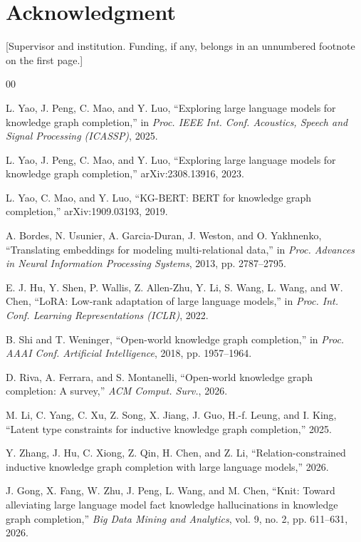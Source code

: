\documentclass[conference]{IEEEtran}
\begin{document}
\section*{Acknowledgment}

[Supervisor and institution. Funding, if any, belongs in an unnumbered footnote
on the first page.]

\begin{thebibliography}{00}

 L. Yao, J. Peng, C. Mao, and Y. Luo, ``Exploring large language
models for knowledge graph completion,'' in \emph{Proc. IEEE Int. Conf.
Acoustics, Speech and Signal Processing (ICASSP)}, 2025.

 L. Yao, J. Peng, C. Mao, and Y. Luo, ``Exploring large
language models for knowledge graph completion,'' arXiv:2308.13916, 2023.

 L. Yao, C. Mao, and Y. Luo, ``KG-BERT: BERT for knowledge graph
completion,'' arXiv:1909.03193, 2019.

 A. Bordes, N. Usunier, A. Garcia-Duran, J. Weston, and
O. Yakhnenko, ``Translating embeddings for modeling multi-relational data,'' in
\emph{Proc. Advances in Neural Information Processing Systems}, 2013,
pp. 2787--2795.

 E. J. Hu, Y. Shen, P. Wallis, Z. Allen-Zhu, Y. Li, S. Wang,
L. Wang, and W. Chen, ``LoRA: Low-rank adaptation of large language models,'' in
\emph{Proc. Int. Conf. Learning Representations (ICLR)}, 2022.

 B. Shi and T. Weninger, ``Open-world knowledge graph
completion,'' in \emph{Proc. AAAI Conf. Artificial Intelligence}, 2018,
pp. 1957--1964.

 D. Riva, A. Ferrara, and S. Montanelli, ``Open-world
knowledge graph completion: A survey,'' \emph{ACM Comput. Surv.}, 2026.

 M. Li, C. Yang, C. Xu, Z. Song, X. Jiang, J. Guo, H.-f. Leung,
and I. King, ``Latent type constraints for inductive knowledge graph
completion,'' 2025.

 Y. Zhang, J. Hu, C. Xiong, Z. Qin, H. Chen, and Z. Li,
``Relation-constrained inductive knowledge graph completion with large language
models,'' 2026.

 J. Gong, X. Fang, W. Zhu, J. Peng, L. Wang, and M. Chen, ``Knit:
Toward alleviating large language model fact knowledge hallucinations in
knowledge graph completion,'' \emph{Big Data Mining and Analytics}, vol. 9,
no. 2, pp. 611--631, 2026.


\end{thebibliography}
\end{document}
